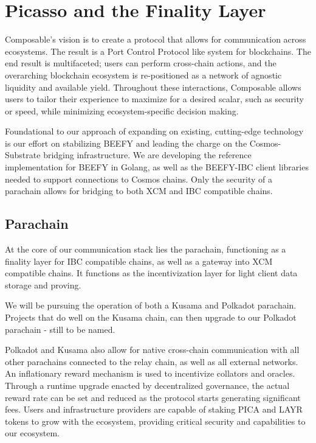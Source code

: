 \section{Picasso and the Finality Layer\label{sec:parachain}}

Composable’s vision is to create a protocol that allows for communication across ecosystems. The result is a Port Control Protocol like system for blockchains. The end result is multifaceted; users can perform cross-chain actions, and the overarching blockchain ecosystem is re-positioned as a network of agnostic liquidity and available yield. Throughout these interactions, Composable allows users to tailor their experience to maximize for a desired scalar, such as security or speed, while minimizing ecosystem-specific decision making.

Foundational to our approach of expanding on existing, cutting-edge technology is our effort on stabilizing BEEFY and leading the charge on the Cosmos-Substrate bridging infrastructure. We are developing the reference implementation for BEEFY in Golang, as well as the BEEFY-IBC client libraries needed to support connections to Cosmos chains. Only the security of a parachain allows for bridging to both XCM and IBC compatible chains.

\subsection{Parachain}

At the core of our communication stack lies the parachain, functioning as a finality layer for IBC compatible chains, as well as a gateway into XCM compatible chains. It functions as the incentivization layer for light client data storage and proving.

We will be pursuing the operation of both a Kusama and Polkadot parachain.
%
Projects that do well on the Kusama chain, can then upgrade to our Polkadot parachain - still to be named.

Polkadot and Kusama also allow for native cross-chain communication with all other parachains connected to the relay chain, as well as all external networks. An inflationary reward mechanism is used to incentivize collators and oracles. Through a runtime upgrade enacted by decentralized governance, the actual reward rate can be set and reduced as the protocol starts generating significant fees. Users and infrastructure providers are capable of staking PICA and LAYR tokens to grow with the ecosystem, providing critical security and capabilities to our ecosystem. 

